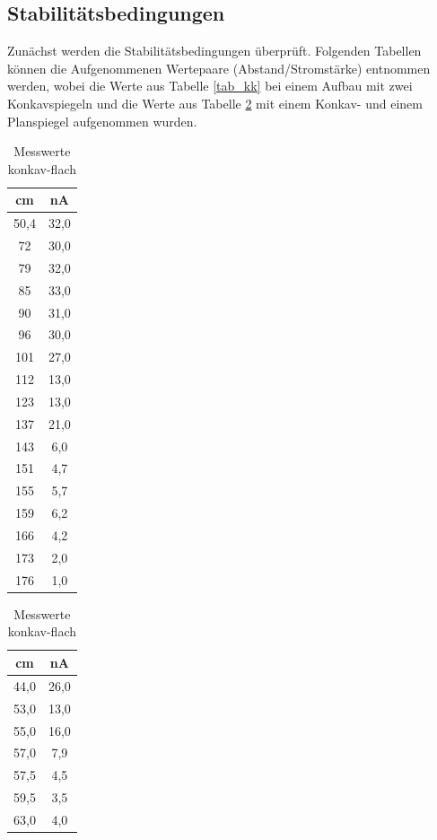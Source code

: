 \subsection{Stabilitätsbedingungen}
Zunächst werden die Stabilitätsbedingungen überprüft. Folgenden Tabellen können die Aufgenommenen Wertepaare (Abstand/Stromstärke) entnommen werden, wobei die Werte aus Tabelle \ref{tab_kk} bei einem Aufbau mit zwei Konkavspiegeln und die Werte aus Tabelle \ref{tab_kf} mit einem Konkav- und einem Planspiegel aufgenommen wurden.
\begin{table}[htbp]
	\begin{minipage}[t]{0.45\textwidth} 
	\begin{tabular}[t]{c|c}
	cm & nA\\ \hline
	50,4 &   32,0\\
 	72    &  30,0\\
 	79     & 32,0\\
 	85      &33,0\\
 	90      &31,0\\
 	96      &30,0\\
 	101     &27,0\\
 	112     &13,0\\
 	123     &13,0\\
 	137     &21,0\\
 	143     &6,0\\
 	151     &4,7\\
 	155     &5,7\\
 	159     &6,2\\
 	166     &4,2\\
 	173     &2,0\\
 	176     &1,0
	\end{tabular}
	\caption{Messwerte konkav-konkav}
	\label{tab_kk}
	\end{minipage}
	\begin{minipage}[t]{0.45\textwidth} 
	\begin{tabular}[t]{c|c}
	cm & nA\\ \hline
	44,0&    26,0\\
	53,0&    13,0\\
	55,0&    16,0\\
	57,0&    7,9\\
	57,5&    4,5\\
	59,5&    3,5\\
	63,0&    4,0
	\end{tabular}
	\caption{Messwerte konkav-flach}
	\label{tab_kf}
	\end{minipage}
\end{table}


